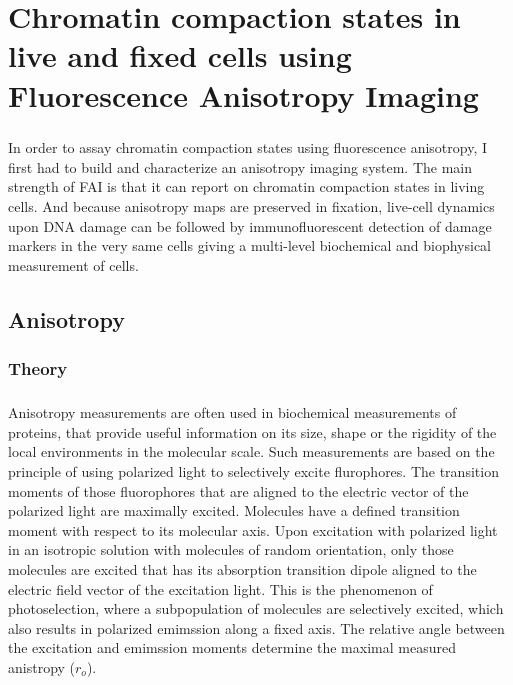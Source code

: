 \chapter{Chromatin compaction states in live and fixed cells using Fluorescence Anisotropy Imaging}

\paragraph*{} In order to assay chromatin compaction states using fluorescence anisotropy, I first had to build and characterize an anisotropy imaging system. The main strength of FAI is that it can report on chromatin compaction states in living cells. And because anisotropy maps are preserved in fixation, live-cell dynamics upon DNA damage can be followed by immunofluorescent detection of damage markers in the very same cells giving a multi-level biochemical and biophysical measurement of cells.

\section{Anisotropy}
\subsection{Theory}
\paragraph*{} Anisotropy measurements are often used in biochemical measurements of proteins, that provide useful information on its size, shape or the rigidity of the local environments in the molecular scale. Such measurements are based on the principle of using polarized light to selectively excite flurophores. The transition moments of those fluorophores that are aligned to the electric vector of the polarized light are maximally excited. Molecules have a defined transition moment with respect to its molecular axis. Upon excitation with polarized light in an isotropic solution with molecules of random orientation, only those molecules are excited that has its absorption transition dipole aligned to the electric field vector of the excitation light. This is the phenomenon of photoselection, where a subpopulation of molecules are selectively excited, which also results in polarized emimssion along a fixed axis. The relative angle between the excitation and emimssion moments determine the maximal measured anistropy ($r_o$).

